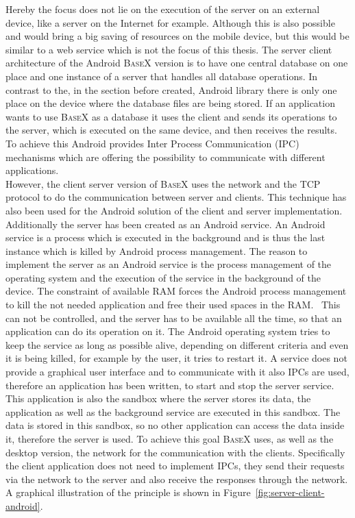 Hereby the focus does not lie on the execution of the server on an external device, like a server on the Internet for example.
Although this is also possible and would bring a big saving of resources on the mobile device, but this would be similar to a web service which is not the focus of this thesis.
The server client architecture of the Android \textsc{BaseX} version is to have one central database on one place and one instance of a server that handles all database operations.
In contrast to the, in the section before created, Android library there is only one place on the device where the database files are being stored.
If an application wants to use \textsc{BaseX} as a database it uses the client and sends its operations to the server, which is executed on the same device, and then receives the results.
To achieve this Android provides Inter Process Communication (IPC) mechanisms which are offering the possibility to communicate with different applications.\\
However, the client server version of \textsc{BaseX} uses the network and the TCP protocol to do the communication between server and clients.
This technique has also been used for the Android solution of the client and server implementation.
Additionally the server has been created as an Android service.
An Android service is a process which is executed in the background and is thus the last instance which is killed by Android process management.
The reason to implement the server as an Android service is the process management of the operating system and the execution of the service in the background of the device.
The constraint of available RAM forces the Android process management to kill the not needed application and free their used spaces in the RAM.~\cite{developers2011android}
This can not be controlled, and the server has to be available all the time, so that an application can do its operation on it.
The Android operating system tries to keep the service as long as possible alive, depending on different criteria and even it is being killed, for example by the user, it tries to restart it.
A service does not provide a graphical user interface and to communicate with it also IPCs are used, therefore an application has been written, to start and stop the server service.
This application is also the sandbox where the server stores its data, the application as well as the background service are executed in this sandbox.
The data is stored in this sandbox, so no other application can access the data inside it, therefore the server is used.
To achieve this goal \textsc{BaseX} uses, as well as the desktop version, the network for the communication with the clients.
Specifically the client application does not need to implement IPCs, they send their requests via the network to the server and also receive the responses through the network.
A graphical illustration of the principle is shown in Figure~\ref{fig:server-client-android}.

